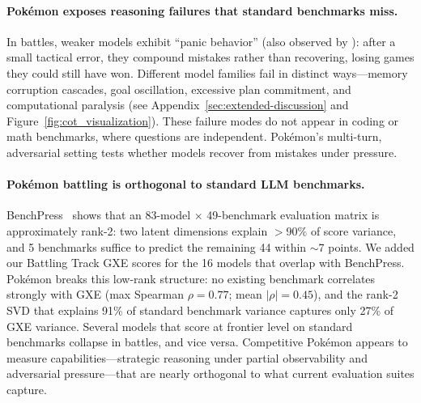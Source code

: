 \paragraph{Pokémon exposes reasoning failures that standard benchmarks miss.} In battles, weaker models exhibit ``panic behavior'' (also observed by \citep{gemini2p5report}): after a small tactical error, they compound mistakes rather than recovering, losing games they could still have won. Different model families fail in distinct ways---memory corruption cascades, goal oscillation, excessive plan commitment, and computational paralysis (see Appendix~\ref{sec:extended-discussion} and Figure~\ref{fig:cot_visualization}). These failure modes do not appear in coding or math benchmarks, where questions are independent. Pokémon's multi-turn, adversarial setting tests whether models recover from mistakes under pressure.

\paragraph{Pokémon battling is orthogonal to standard LLM benchmarks.} BenchPress~\citep{papailiopoulos2026benchpress} shows that an 83-model $\times$ 49-benchmark evaluation matrix is approximately rank-2: two latent dimensions explain $>$90\% of score variance, and 5 benchmarks suffice to predict the remaining 44 within $\sim$7 points. We added our Battling Track GXE scores for the 16 models that overlap with BenchPress. Pokémon breaks this low-rank structure: no existing benchmark correlates strongly with GXE (max Spearman $\rho = 0.77$; mean $|\rho| = 0.45$), and the rank-2 SVD that explains 91\% of standard benchmark variance captures only 27\% of GXE variance. Several models that score at frontier level on standard benchmarks collapse in battles, and vice versa. Competitive Pokémon appears to measure capabilities---strategic reasoning under partial observability and adversarial pressure---that are nearly orthogonal to what current evaluation suites capture.